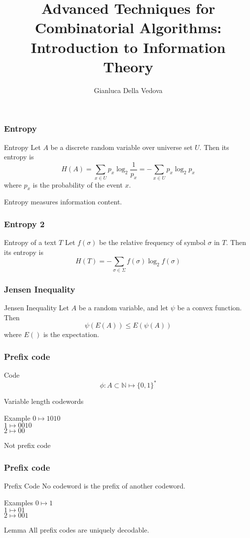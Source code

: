 \documentclass[14pt]{beamer}
\author{Gianluca Della Vedova}
\title[Advanced Algorithms]{Advanced Techniques for Combinatorial Algorithms:
Introduction to Information Theory}
\institute[]{Univ. Milano--Bicocca\\
  \texttt{http://gianluca.dellavedova.org}}
\date[]{{\tiny \vcsDate\hspace{1em} \vcsShortHash}}
\begin{document}
\begin{frame}
  \titlepage
\end{frame}



\begin{frame}\frametitle{Entropy}
\begin{block}{Entropy}
Let $A$ be a discrete random variable over universe set $U$.    
Then its entropy is 
\[H(A) = \sum_{x\in U} p_{x} \log_{2} \frac{1}{p_{x}} = - \sum_{x\in U} p_{x} \log_{2} p_{x} \]
where $p_{x}$ is the probability of the event $x$.    
\end{block}

Entropy measures information content.    
\end{frame}

\begin{frame}\frametitle{Entropy 2}
\begin{block}{Entropy of a text $T$}
Let $f(\sigma)$ be the relative frequency of symbol $\sigma$ in $T$.    
Then its entropy is 
\[H(T) = - \sum_{\sigma\in \Sigma} f(\sigma) \log_{2} f(\sigma) \]
\end{block}
\end{frame}

\begin{frame}\frametitle{Jensen Inequality}
\begin{block}{Jensen Inequality}
Let $A$ be a random variable, and let $\psi$ be a convex function.    
Then 
\[\psi(E(A)) \le E(\psi(A))\]
where $E()$ is the expectation.    
\end{block}
\end{frame}

\begin{frame}\frametitle{Prefix code}
\begin{block}{Code}
\[\phi : A \subset \mathbb{N} \mapsto \{0,1\}^{*}\]
\end{block}

\alert{Variable} length codewords

\begin{block}{Example}
$0 \mapsto 1010$\\
$1 \mapsto 0010$\\
$2 \mapsto 00$
\end{block}

\alert{Not} prefix code
\end{frame}

\begin{frame}\frametitle{Prefix code}
\begin{block}{Prefix Code}
No codeword is the prefix of another codeword.    
\end{block}

\begin{block}{Examples}
$0 \mapsto 1$\\
$1 \mapsto 01$\\
$2 \mapsto 001$
\end{block}


\begin{block}{Lemma}
All prefix codes are uniquely decodable.    
\end{block}
\end{frame}
\end{document}
